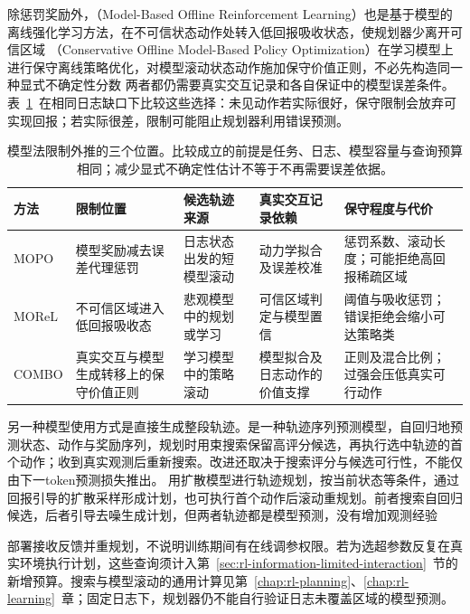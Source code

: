 除惩罚奖励外，（Model-Based Offline Reinforcement Learning）也是基于模型的离线强化学习方法，在不可信状态动作处转入低回报吸收状态，使规划器少离开可信区域
（Conservative Offline Model-Based Policy Optimization）在学习模型上进行保守离线策略优化，对模型滚动状态动作施加保守价值正则，不必先构造同一种显式不确定性分数
两者都仍需要真实交互记录和各自保证中的模型误差条件。表~\ref{tab:rl-information-model-methods}~在相同日志缺口下比较这些选择：未见动作若实际很好，保守限制会放弃可实现回报；若实际很差，限制可能阻止规划器利用错误预测。

\begin{table}[t]
  \centering
  \small
  \begin{tabularx}{\linewidth}{p{17mm}XXXX}
    \toprule
    方法 & 限制位置 & 候选轨迹来源 & 真实交互记录依赖 & 保守程度与代价 \\
    \midrule
    MOPO & 模型奖励减去误差代理惩罚 & 日志状态出发的短模型滚动 & 动力学拟合及误差校准 & 惩罚系数、滚动长度；可能拒绝高回报稀疏区域 \\
    MOReL & 不可信区域进入低回报吸收态 & 悲观模型中的规划或学习 & 可信区域判定与模型置信 & 阈值与吸收惩罚；错误拒绝会缩小可达策略类 \\
    COMBO & 真实交互与模型生成转移上的保守价值正则 & 学习模型中的策略滚动 & 模型拟合及日志动作的价值支撑 & 正则及混合比例；过强会压低真实可行动作 \\
    \bottomrule
  \end{tabularx}
  \caption{模型法限制外推的三个位置。比较成立的前提是任务、日志、模型容量与查询预算相同；减少显式不确定性估计不等于不再需要误差依据。}
  \label{tab:rl-information-model-methods}
\end{table}

另一种模型使用方式是直接生成整段轨迹。是一种轨迹序列预测模型，自回归地预测状态、动作与奖励序列，规划时用束搜索保留高评分候选，再执行选中轨迹的首个动作；收到真实观测后重新搜索。改进还取决于搜索评分与候选可行性，不能仅由下一token预测损失推出。
用扩散模型进行轨迹规划，按当前状态等条件，通过回报引导的扩散采样形成计划，也可执行首个动作后滚动重规划。前者搜索自回归候选，后者引导去噪生成计划，但两者轨迹都是模型预测，没有增加观测经验

部署接收反馈并重规划，不说明训练期间有在线调参权限。若为选超参数反复在真实环境执行计划，这些查询须计入第~\ref{sec:rl-information-limited-interaction}~节的新增预算。搜索与模型滚动的通用计算见第~\ref{chap:rl-planning}、\ref{chap:rl-learning}~章；固定日志下，规划器仍不能自行验证日志未覆盖区域的模型预测。


